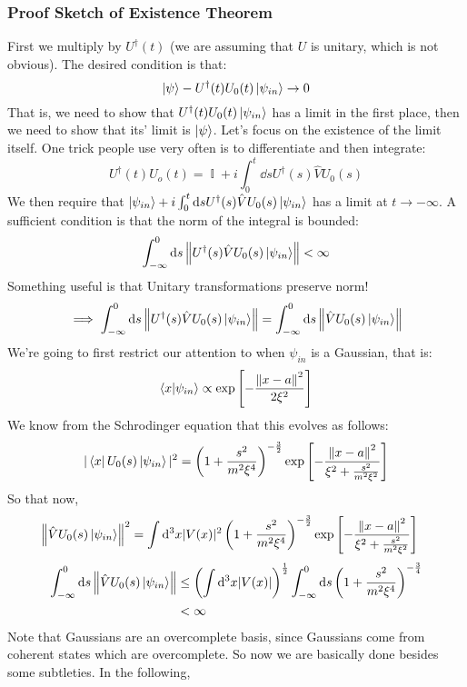 \documentclass{article}
\DeclareMathOperator{\II}{\mathbb{I}}
\renewcommand{\norm}[1]{\left\lVert#1\right\rVert}
\begin{document}
\subsubsection{Proof Sketch of Existence Theorem}
First we multiply by $U^\dagger(t)$ (we are assuming that $U$ is unitary, which is not obvious). The desired condition is that:
\[\ket{\psi}-U^\dagger(t)U_0(t)\ket{\psi_{in}}\to 0\]
That is, we need to show that $U^\dagger(t)U_0(t)\ket{\psi_{in}}$ has a limit in the first place, then we need to show that its' limit is $\ket{\psi}$. Let's focus on the existence of the limit itself. One trick people use very often is to differentiate and then integrate:
\begin{equation}\label{scattering_exercise_1}U^\dagger(t)U_o(t) = \II+ i\int_0^t \dd s U^\dagger(s) \hat V U_0(s) \end{equation}
We then require that $\ket{\psi_{in}}+ i\int_0^t \dd s U^\dagger(s) \hat V U_0(s)\ket{\psi_{in}}$ has a limit at $t\to -\infty$. A sufficient condition is that the norm of the integral is bounded:
\[\int_{-\infty}^0 \dd s \norm{U^\dagger(s) \hat V U_0(s) \ket{\psi_{in}}} < \infty\]
Something useful is that Unitary transformations preserve norm!
\[\implies \int_{-\infty}^0 \dd s \norm{U^\dagger(s) \hat V U_0(s) \ket{\psi_{in}}}  = \int_{-\infty}^0 \dd s \norm{\hat V U_0(s) \ket{\psi_{in}}}\]
We're going to first restrict our attention to when $\psi_{in}$ is a Gaussian, that is:
\[\bra{x}\ket{\psi_{in}} \propto \exp\left[-\frac{\norm{x-a}^2}{2\xi^2}\right]\]
We know from the Schrodinger equation that this evolves as follows:
\begin{equation} |\bra{x}U_0(s)\ket{\psi_{in}}|^2= \left(1+\frac{s^2}{m^2\xi^4}\right)^{-\frac{3}{2}}\exp\left[-\frac{\norm{x-a}^2}{\xi^2+\frac{s^2}{m^2\xi^2}}\right]\end{equation}
So that now,
\begin{align} \norm{\hat V U_0(s)\ket{\psi_{in}}}^2 &= \int \dd^3 x |V(x)|^2\left(1+\frac{s^2}{m^2\xi^4}\right)^{-\frac{3}{2}}\exp\left[-\frac{\norm{x-a}^2}{\xi^2+\frac{s^2}{m^2\xi^2}}\right]
\end{align}
\begin{align} \int_{-\infty}^0 \dd s \norm{\hat V U_0(s) \ket{\psi_{in}}} & \leq \left(\int \dd ^3 x|V(x)|\right)^{\frac{1}{2}}\int_{-\infty}^0 \dd s \left(1+\frac{s^2}{m^2\xi^4}\right)^{-\frac{3}{4}}\\&<\infty \label{scattering_exercise_2}\end{align}
Note that Gaussians are an overcomplete basis, since Gaussians come from coherent states which are overcomplete. So now we are basically done besides some subtleties. In the following,
\end{document}
